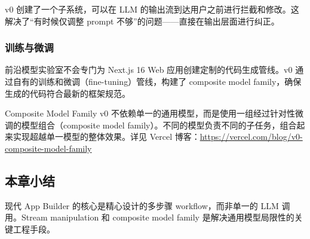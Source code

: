 v0 创建了一个子系统，可以在 LLM 的输出流到达用户之前进行拦截和修改。这解决了``有时候仅调整 prompt 不够''的问题——直接在输出层面进行纠正。

\subsubsection{训练与微调}

前沿模型实验室不会专门为 Next.js 16 Web 应用创建定制的代码生成管线。v0 通过自有的训练和微调（fine-tuning）管线，构建了 composite model family，确保生成的代码符合最新的框架规范。

\begin{knowledgebox}{Composite Model Family}
v0 不依赖单一的通用模型，而是使用一组经过针对性微调的模型组合（composite model family）。不同的模型负责不同的子任务，组合起来实现超越单一模型的整体效果。详见 Vercel 博客：\url{https://vercel.com/blog/v0-composite-model-family}
\end{knowledgebox}

\subsection{本章小结}

现代 App Builder 的核心是精心设计的多步骤 workflow，而非单一的 LLM 调用。Stream manipulation 和 composite model family 是解决通用模型局限性的关键工程手段。

